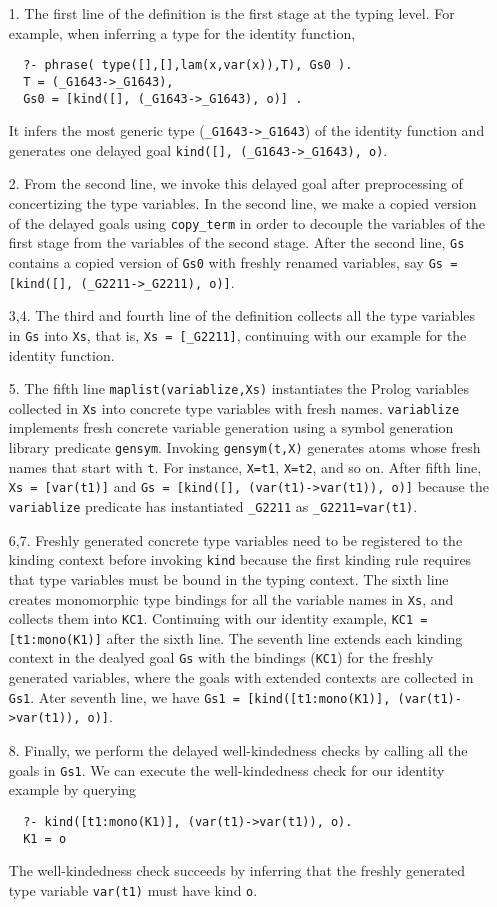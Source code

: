 \documentclass[runningheads,a4paper]{llncs}
\begin{document}
\begin{itemize}
\item[1.]
The first line of the definition is the first stage at the typing level.
For example, when inferring a type for the identity function,
\begin{verbatim}
  ?- phrase( type([],[],lam(x,var(x)),T), Gs0 ).
  T = (_G1643->_G1643),
  Gs0 = [kind([], (_G1643->_G1643), o)] .
\end{verbatim}
It infers the most generic type (\verb|_G1643->_G1643|)
of the identity function and generates one delayed goal
\verb|kind([], (_G1643->_G1643), o)|.
\item[2.] From the second line,
we invoke this delayed goal after preprocessing of concertizing
the type variables. In the second line, we make a copied version of
the delayed goals using \verb|copy_term| in order to decouple
the variables of the first stage from the variables of the second stage.
After the second line, \verb|Gs| contains a copied version of \verb|Gs0|
with freshly renamed variables, say
\verb|Gs = [kind([], (_G2211->_G2211), o)]|.
\item[3,4.]
The third and fourth line of the definition collects all the type variables
in \verb|Gs| into \verb|Xs|, that is, \verb|Xs = [_G2211]|, continuing with
our example for the identity function.
\item[5.]
The fifth line \verb|maplist(variablize,Xs)| instantiates
the Prolog variables collected in \verb|Xs| into
concrete type variables with fresh names. \verb|variablize|
implements fresh concrete variable generation using
a symbol generation library predicate \verb|gensym|.
Invoking \verb|gensym(t,X)| generates atoms whose fresh names that
start with \verb|t|. For instance, \verb|X=t1|, \verb|X=t2|, and so on.
After fifth line, \verb|Xs = [var(t1)]| and
\verb|Gs = [kind([], (var(t1)->var(t1)), o)]| because 
the \verb|variablize| predicate has instantiated \verb|_G2211|
as \verb|_G2211=var(t1)|.
\item[6,7.] Freshly generated concrete type variables need to be
registered to the kinding context before invoking \verb|kind|
because the first kinding rule requires that type variables must be
bound in the typing context. The sixth line creates monomorphic
type bindings for all the variable names in \verb|Xs|, and collects
them into \verb|KC1|. Continuing with our identity example,
\verb|KC1 = [t1:mono(K1)]| after the sixth line. The seventh line
extends each kinding context in the dealyed goal \verb|Gs| with
the bindings (\verb|KC1|) for the freshly generated variables, 
where the goals with extended contexts are collected in \verb|Gs1|.
Ater seventh line, we have 
\verb|Gs1 = [kind([t1:mono(K1)], (var(t1)->var(t1)), o)]|.
\item[8.] Finally, we perform the delayed well-kindedness checks by calling
all the goals in \verb|Gs1|. We can execute the well-kindedness check for
our identity example by querying
\begin{verbatim}
  ?- kind([t1:mono(K1)], (var(t1)->var(t1)), o).
  K1 = o
\end{verbatim}
The well-kindedness check succeeds by inferring that the freshly generated
type variable \verb|var(t1)| must have kind \verb|o|.
\end{itemize}
\end{document}
